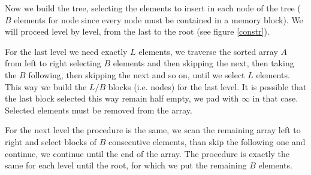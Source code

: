 \documentclass[a4paper]{article}
\begin{document}
Now we build the tree, selecting the elements to insert in each node of the tree ($B$ elements for node since every node must be contained in a memory block).
We will proceed level by level, from the last to the root (see figure \ref{constr}).

For the last level we need exactly $L$ elements, we traverse the sorted array $A$ from left to right selecting $B$ elements and then skipping the next, then taking the $B$ following, then skipping the next and so on, until we select $L$ elements.
This way we build the $L/B$ blocks (i.e. nodes) for the last level.
It is possible that the last block selected this way remain half empty, we pad with $\infty$ in that case.
Selected elements must be removed from the array.

For the next level the procedure is the same, we scan the remaining array left to right and select blocks of $B$ consecutive elements, than skip the following one and continue, we continue until the end of the array.
The procedure is exactly the same for each level until the root, for which we put the remaining $B$ elements.
\end{document}
